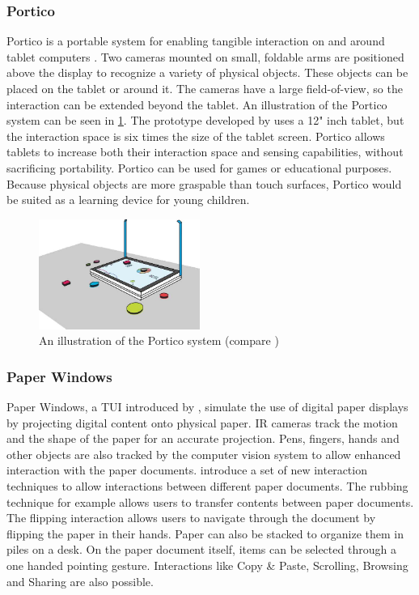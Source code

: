 \subsubsection{Portico}
Portico is a portable system for enabling tangible interaction on and around tablet computers \cite{avrahami11}. Two cameras mounted on small, foldable arms are positioned above the display to recognize a variety of physical objects. These objects can be placed on the tablet or around it. The cameras have a large field-of-view, so the interaction can be extended beyond the tablet. An illustration of the Portico system can be seen in \ref{fig:portico}. The prototype developed by \cite{avrahami11} uses a 12" inch tablet, but the interaction space is six times the size of the tablet screen. Portico allows tablets to increase both their interaction space and sensing capabilities, without sacrificing portability. Portico can be used for games or educational purposes. Because physical objects are more graspable than touch surfaces, Portico would be suited as a learning device for young children. 

\begin{figure}
\centering
\includegraphics[width=0.47\textwidth]{figures/portico.jpg}
\caption{An illustration of the Portico system (compare \protect\cite{avrahami11})}
\label{fig:portico}
\end{figure}

\subsubsection{Paper Windows}
Paper Windows, a TUI introduced by \cite{holman05}, simulate the use of digital paper displays by projecting digital content onto physical paper. IR cameras track the motion and the shape of the paper for an accurate projection. Pens, fingers, hands and other objects are also tracked by the computer vision system to allow enhanced interaction with the paper documents. \cite{holman05} introduce a set of new interaction techniques to allow interactions between different paper documents. The rubbing technique for example allows users to transfer contents between paper documents. The flipping interaction allows users to navigate through the document by flipping the paper in their hands. Paper can also be stacked to organize them in piles on a desk. On the paper document itself, items can be selected through a one handed pointing gesture. Interactions like Copy \& Paste, Scrolling, Browsing and Sharing are also possible.

